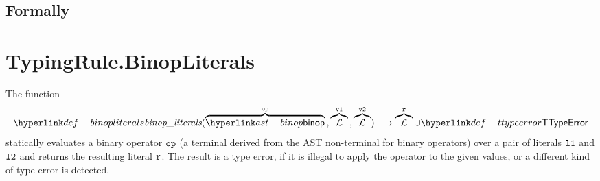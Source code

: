 \subsection{Formally}

\section{TypingRule.BinopLiterals \label{sec:TypingRule.BinopLiterals}}
\hypertarget{def-binopliterals}{}
The function
\[
  \binopliterals(\overname{\binop}{\op} \aslsep \overname{\literals}{\vvone} \aslsep \overname{\literals}{\vvtwo}) \aslto
  \overname{\literals}{\vr} \cup \TTypeError
\]
statically evaluates a binary operator $\texttt{op}$ (a terminal derived from the AST non-terminal for binary operators)
over a pair of literals $\texttt{l1}$ and $\texttt{l2}$
and returns the resulting literal $\texttt{r}$.
The result is a type error, if it is illegal to apply the operator
to the given values, or a different kind of type error is detected.

